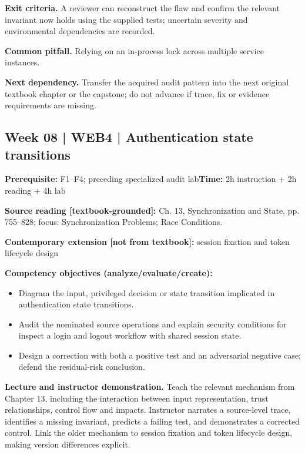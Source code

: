 \documentclass[10pt,letterpaper]{article}
\begin{document}
\textbf{Exit criteria.} A reviewer can reconstruct the flaw and confirm the relevant invariant now holds using the supplied tests; uncertain severity and environmental dependencies are recorded.

\textbf{Common pitfall.} Relying on an in-process lock across multiple service instances.

\textbf{Next dependency.} Transfer the acquired audit pattern into the next original textbook chapter or the capstone; do not advance if trace, fix or evidence requirements are missing.

\subsection{Week 08 | WEB4 | Authentication state transitions}
\textbf{Prerequisite:} F1--F4; preceding specialized audit lab\hfill\textbf{Time:} 2h instruction + 2h reading + 4h lab

\textbf{Source reading [textbook-grounded]:} Ch. 13, Synchronization and State, pp. 755--828; focus: Synchronization Problems; Race Conditions.

\textbf{Contemporary extension [not from textbook]:} session fixation and token lifecycle design

\textbf{Competency objectives (analyze/evaluate/create):}
\begin{itemize}[leftmargin=*,itemsep=2pt]
\item Diagram the input, privileged decision or state transition implicated in authentication state transitions.
\item Audit the nominated source operations and explain security conditions for inspect a login and logout workflow with shared session state.
\item Design a correction with both a positive test and an adversarial negative case; defend the residual-risk conclusion.
\end{itemize}
\textbf{Lecture and instructor demonstration.} Teach the relevant mechanism from Chapter 13, including the interaction between input representation, trust relationships, control flow and impacts. Instructor narrates a source-level trace, identifies a missing invariant, predicts a failing test, and demonstrates a corrected control. Link the older mechanism to session fixation and token lifecycle design, making version differences explicit.
\end{document}
